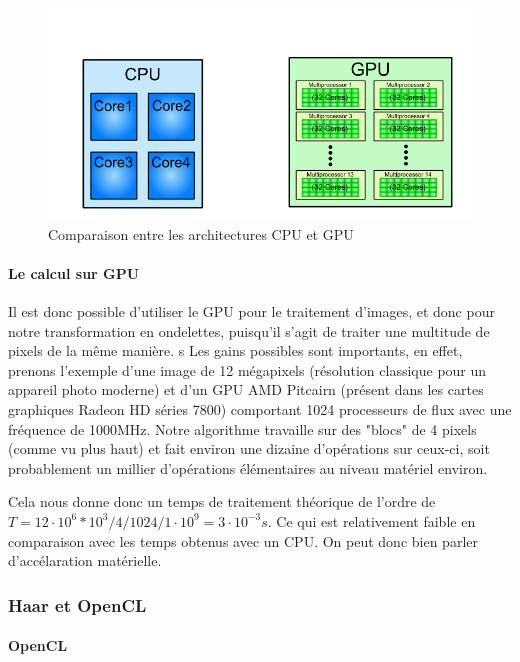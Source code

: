 \begin{figure}[!h]
\centering
\includegraphics[scale=0.5]{images/cpugpu.png}
\caption{Comparaison entre les architectures CPU et GPU}
\label{cpugpu}
\end{figure}

\clearpage

\paragraph{Le calcul sur GPU}

Il est donc possible d'utiliser le GPU pour le traitement d'images, et donc pour notre transformation en ondelettes, puisqu'il s'agit de traiter une multitude de pixels de la même manière.
s
Les gains possibles sont importants, en effet, prenons l'exemple d'une image de 12 mégapixels (résolution classique pour un appareil photo moderne) et d'un GPU AMD Pitcairn (présent dans les cartes graphiques Radeon HD séries 7800) comportant 1024 processeurs de flux avec une fréquence de 1000MHz. Notre algorithme travaille sur des "blocs" de 4 pixels (comme vu plus haut) et fait environ une dizaine d'opérations sur ceux-ci, soit probablement un millier d'opérations élémentaires au niveau matériel environ.

Cela nous donne donc un temps de traitement théorique de l'ordre de $T = 12\cdot{}10^6 * 10^3 / 4 / 1024 / 1\cdot{}10^9 = 3\cdot{}10^{-3} s$. Ce qui est relativement faible en comparaison avec les temps obtenus avec un CPU. On peut donc bien parler d'accélaration matérielle.

\subsubsection{Haar et OpenCL}

\paragraph{OpenCL}

